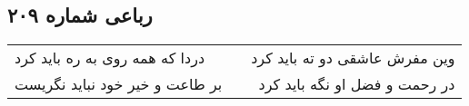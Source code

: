 \begin{center}
\section*{رباعی شماره ۲۰۹}
\label{sec:sh209}
\begin{longtable}{l p{0.5cm} r}
دردا که همه روی به ره باید کرد
&&
وین مفرش عاشقی دو ته باید کرد
\\
بر طاعت و خیر خود نباید نگریست
&&
در رحمت و فضل او نگه باید کرد
\\
\end{longtable}
\end{center}
